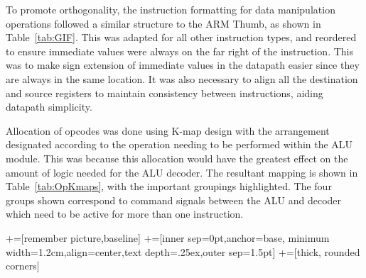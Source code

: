 To promote orthogonality, the instruction formatting for data manipulation operations followed a similar structure to the ARM Thumb, as shown in Table~\ref{tab:GIF}. 
This was adapted for all other instruction types, and reordered to ensure immediate values were always on the far right of the instruction. 
This was to make sign extension of immediate values in the datapath easier since they are always in the same location.
It was also necessary to align all the destination and source registers to maintain consistency between instructions, aiding datapath simplicity. 

Allocation of opcodes was done using K-map design with the arrangement designated according to the operation needing to be performed within the ALU module. 
This was because this allocation would have the greatest effect on the amount of logic needed for the ALU decoder. 
The resultant mapping is shown in Table~\ref{tab:OpKmaps}, with the important groupings highlighted. 
The four groups shown correspond to command signals between the ALU and decoder which need to be active for more than one instruction. 
\newcommand\tabnode[1]{\addtocounter{nodecount}{1} \tikz \node (\arabic{nodecount}) {#1};}

\newcommand\newcell[1]{\hspace{-0.5mm}\tabnode{#1}\hspace{-0.5mm}}

+=[remember picture,baseline]
+=[inner sep=0pt,anchor=base,
minimum width=1.2cm,align=center,text depth=.25ex,outer sep=1.5pt]
+=[thick, rounded corners]

\newcommand{\darkercolor}[3]{%
    \colorlet{#3}{#1!#2!black}
}
\darkercolor{green}{60}{darkgreen}

